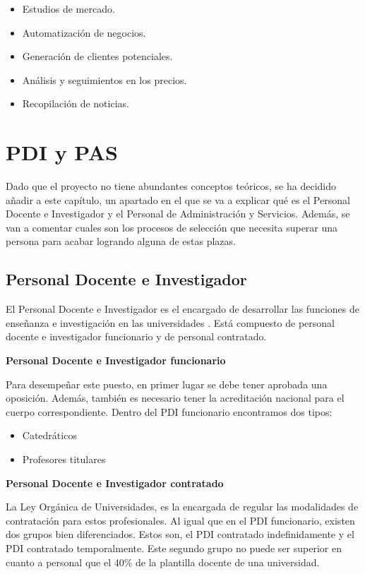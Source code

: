 \begin{itemize}
    \item Estudios de mercado.
    \item Automatización de negocios.
    \item Generación de clientes potenciales.
    \item Análisis y seguimientos en los precios.
    \item Recopilación de noticias.
\end{itemize}

\section{PDI y PAS}

Dado que el proyecto no tiene abundantes conceptos teóricos, se ha decidido añadir a este capítulo, un apartado en el que se va a explicar qué es el Personal Docente e Investigador y el Personal de Administración y Servicios. Además, se van a comentar cuales son los procesos de selección que necesita superar una persona para acabar logrando alguna de estas plazas.

\subsection{Personal Docente e Investigador}
El Personal Docente e Investigador es el encargado de desarrollar las funciones de enseñanza e investigación en las universidades \cite{raepdi:latex}. Está compuesto de personal docente e investigador funcionario y de personal contratado.

\textbf{Personal Docente e Investigador funcionario}

Para desempeñar este puesto, en primer lugar se debe tener aprobada una oposición. Además, también es necesario tener la acreditación nacional para el cuerpo correspondiente. Dentro del PDI funcionario encontramos dos tipos:

\begin{itemize}
    \item Catedráticos
    \item Profesores titulares
\end{itemize}

\textbf{Personal Docente e Investigador contratado}

La Ley Orgánica de Universidades, es la encargada de regular las modalidades de contratación para estos profesionales. Al igual que en el PDI funcionario, existen dos grupos bien diferenciados. Estos son, el PDI contratado indefinidamente y el PDI contratado temporalmente. Este segundo grupo no puede ser superior en cuanto a personal que el 40\% de la plantilla docente de una universidad.

